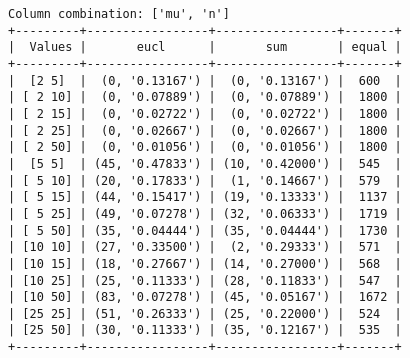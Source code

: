 \documentclass{article}
\begin{document}
\begin{verbatim}
Column combination: ['mu', 'n']
+---------+-----------------+-----------------+-------+
|  Values |       eucl      |       sum       | equal |
+---------+-----------------+-----------------+-------+
|  [2 5]  |  (0, '0.13167') |  (0, '0.13167') |  600  |
| [ 2 10] |  (0, '0.07889') |  (0, '0.07889') |  1800 |
| [ 2 15] |  (0, '0.02722') |  (0, '0.02722') |  1800 |
| [ 2 25] |  (0, '0.02667') |  (0, '0.02667') |  1800 |
| [ 2 50] |  (0, '0.01056') |  (0, '0.01056') |  1800 |
|  [5 5]  | (45, '0.47833') | (10, '0.42000') |  545  |
| [ 5 10] | (20, '0.17833') |  (1, '0.14667') |  579  |
| [ 5 15] | (44, '0.15417') | (19, '0.13333') |  1137 |
| [ 5 25] | (49, '0.07278') | (32, '0.06333') |  1719 |
| [ 5 50] | (35, '0.04444') | (35, '0.04444') |  1730 |
| [10 10] | (27, '0.33500') |  (2, '0.29333') |  571  |
| [10 15] | (18, '0.27667') | (14, '0.27000') |  568  |
| [10 25] | (25, '0.11333') | (28, '0.11833') |  547  |
| [10 50] | (83, '0.07278') | (45, '0.05167') |  1672 |
| [25 25] | (51, '0.26333') | (25, '0.22000') |  524  |
| [25 50] | (30, '0.11333') | (35, '0.12167') |  535  |
+---------+-----------------+-----------------+-------+
\end{verbatim}
\end{document}
